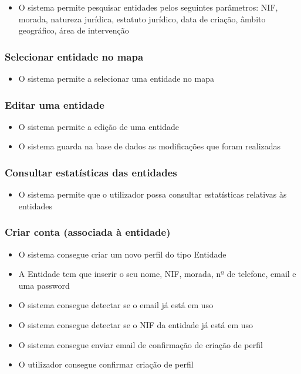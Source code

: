 \documentclass{scrreprt}
\begin{document}
\begin{itemize}
    \item O sistema permite pesquisar entidades pelos seguintes parâmetros: NIF, morada, natureza jurídica, estatuto jurídico, data de criação, âmbito geográfico, área de intervenção
\end{itemize}

\subsubsection{Selecionar entidade no mapa}

\begin{itemize}
    \item O sistema permite a selecionar uma entidade no mapa
\end{itemize}

\subsubsection{Editar uma entidade}

\begin{itemize}
    \item O sistema permite a edição de uma entidade
    \item O sistema guarda na base de dados as modificações que foram realizadas
\end{itemize}

\subsubsection{Consultar estatísticas das entidades}

\begin{itemize}
    \item O sistema permite que o utilizador possa consultar estatísticas relativas às entidades
\end{itemize}

\subsubsection{Criar conta (associada à entidade)}

\begin{itemize}
    \item O sistema consegue criar um novo perfil do tipo Entidade
    \item A Entidade tem que inserir o seu nome, NIF, morada, nº de telefone, email e uma password
    \item O sistema consegue detectar se o email já está em uso
    \item O sistema consegue detectar se o NIF da entidade já está em uso
    \item O sistema consegue enviar email de confirmação de criação de perfil
    \item O utilizador consegue confirmar criação de perfil
\end{itemize}
\end{document}
